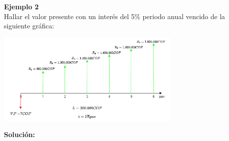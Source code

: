 	\textbf{Ejemplo 2}\\
	Hallar el valor presente con un interés del 5\% periodo anual vencido de la siguiente gráfica:\\
	
	\begin{center}
		\includegraphics[height=4.5cm]{6_Capitulo/img/ejemplos/6_4}
	\end{center}
	
	\textbf{Solución:}
	
